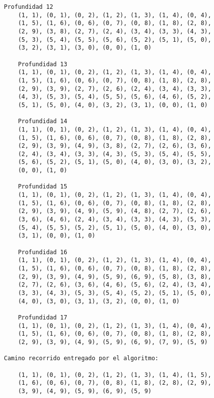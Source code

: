 \begin{lstlisting}[]
    Profundidad 12
    (1, 1), (0, 1), (0, 2), (1, 2), (1, 3), (1, 4), (0, 4), 
    (1, 5), (1, 6), (0, 6), (0, 7), (0, 8), (1, 8), (2, 8), 
    (2, 9), (3, 8), (2, 7), (2, 4), (3, 4), (3, 3), (4, 3), 
    (5, 3), (5, 4), (5, 5), (5, 6), (5, 2), (5, 1), (5, 0), 
    (3, 2), (3, 1), (3, 0), (0, 0), (1, 0)

    Profundidad 13
    (1, 1), (0, 1), (0, 2), (1, 2), (1, 3), (1, 4), (0, 4), 
    (1, 5), (1, 6), (0, 6), (0, 7), (0, 8), (1, 8), (2, 8), 
    (2, 9), (3, 9), (2, 7), (2, 6), (2, 4), (3, 4), (3, 3), 
    (4, 3), (5, 3), (5, 4), (5, 5), (5, 6), (4, 6), (5, 2), 
    (5, 1), (5, 0), (4, 0), (3, 2), (3, 1), (0, 0), (1, 0) 

    Profundidad 14
    (1, 1), (0, 1), (0, 2), (1, 2), (1, 3), (1, 4), (0, 4), 
    (1, 5), (1, 6), (0, 6), (0, 7), (0, 8), (1, 8), (2, 8), 
    (2, 9), (3, 9), (4, 9), (3, 8), (2, 7), (2, 6), (3, 6), 
    (2, 4), (3, 4), (3, 3), (4, 3), (5, 3), (5, 4), (5, 5), 
    (5, 6), (5, 2), (5, 1), (5, 0), (4, 0), (3, 0), (3, 2), 
    (0, 0), (1, 0) 

    Profundidad 15
    (1, 1), (0, 1), (0, 2), (1, 2), (1, 3), (1, 4), (0, 4), 
    (1, 5), (1, 6), (0, 6), (0, 7), (0, 8), (1, 8), (2, 8),
    (2, 9), (3, 9), (4, 9), (5, 9), (4, 8), (2, 7), (2, 6),
    (3, 6), (4, 6), (2, 4), (3, 4), (3, 3), (4, 3), (5, 3), 
    (5, 4), (5, 5), (5, 2), (5, 1), (5, 0), (4, 0), (3, 0), 
    (3, 1), (0, 0), (1, 0)

    Profundidad 16
    (1, 1), (0, 1), (0, 2), (1, 2), (1, 3), (1, 4), (0, 4),
    (1, 5), (1, 6), (0, 6), (0, 7), (0, 8), (1, 8), (2, 8), 
    (2, 9), (3, 9), (4, 9), (5, 9), (6, 9), (5, 8), (3, 8),
    (2, 7), (2, 6), (3, 6), (4, 6), (5, 6), (2, 4), (3, 4), 
    (3, 3), (4, 3), (5, 3), (5, 4), (5, 2), (5, 1), (5, 0), 
    (4, 0), (3, 0), (3, 1), (3, 2), (0, 0), (1, 0) 

    Profundidad 17
    (1, 1), (0, 1), (0, 2), (1, 2), (1, 3), (1, 4), (0, 4), 
    (1, 5), (1, 6), (0, 6), (0, 7), (0, 8), (1, 8), (2, 8), 
    (2, 9), (3, 9), (4, 9), (5, 9), (6, 9), (7, 9), (5, 9)

Camino recorrido entregado por el algoritmo:
    
    (1, 1), (0, 1), (0, 2), (1, 2), (1, 3), (1, 4), (1, 5),
    (1, 6), (0, 6), (0, 7), (0, 8), (1, 8), (2, 8), (2, 9),
    (3, 9), (4, 9), (5, 9), (6, 9), (5, 9)

\end{lstlisting}

\clearpage